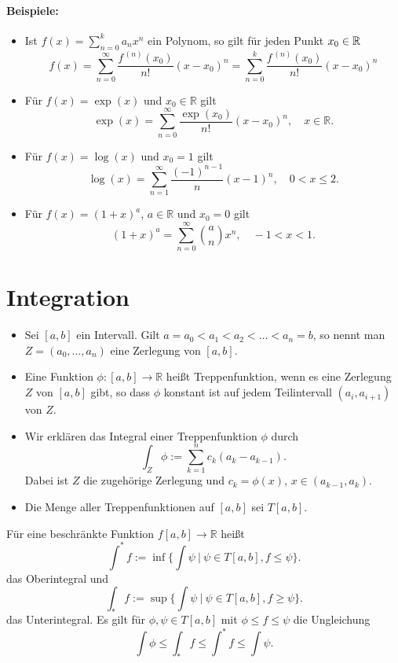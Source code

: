 \documentclass[a4paper,12pt,DIV15]{scrartcl}
\begin{document}
\paragraph{Beispiele:}
\begin{itemize}
\item Ist $f(x) = \sum_{n=0}^k a_n x^n$ ein Polynom, so gilt für jeden Punkt $x_0 \in \mathbb{R}$
\[
 f(x) = \sum_{n=0}^\infty \frac{f^{\,(n)}(x_0)}{n!}(x-x_0)^n 
 = \sum_{n=0}^k  \frac{f^{\,(n)}(x_0)}{n!}(x-x_0)^n
\]
\item Für $f(x)=\exp(x)$ und $x_0 \in \mathbb{R}$ gilt 
\[ \exp(x)= \sum_{n=0}^\infty \frac{\exp(x_0)}{n!} (x-x_0)^n, \quad x
\in \mathbb{R}.\]
\item Für $f(x)=\log(x)$ und $x_0=1$ gilt
\[ \log (x) = \sum_{n=1}^\infty \frac{(-1)^{n-1}}{n}(x-1)^n, \quad 0 <
x \leq 2.\]
\item Für $f(x)= (1+x)^a$, $a\in \mathbb{R}$  und $x_0=0$ gilt
\[ (1+x)^a= \sum_{n =0}^\infty \binom{a}{n}{x^n}, \quad -1 <
x < 1. \]
\end{itemize}

\section{Integration}
\begin{itemize}
\item  Sei $[a,b]$ ein Intervall. Gilt $a=a_0 < a_1 <a_2 < \dots <
                                 a_n=b$, so nennt man $Z=(a_0, \dots
                                 ,a_n)$ eine {\color{red} Zerlegung} von
                                 $[a,b]$.
\item Eine Funktion $\phi:[a,b] \rightarrow \mathbb{R}$ heißt {\color{red}
                                 Treppenfunktion}, wenn es eine
                                 Zerlegung $Z$ von $[a,b]$ gibt, so dass
                                 $\phi$ konstant ist auf jedem
                                 Teilintervall $(a_i,a_{i+1})$ von $Z$.
\item Wir erklären das Integral einer Treppenfunktion $\phi$ durch
\[\int_Z \phi := \sum_{k=1}^n c_k (a_k -a_{k-1}).\]
Dabei ist $Z$ die zugehörige Zerlegung und $c_k=\phi(x)$, $x\in
(a_{k-1},a_k)$.  
\item Die Menge aller Treppenfunktionen auf $[a,b]$ sei $T[a,b]$.
\end{itemize}


\begin{defn}
Für eine beschränkte Funktion $f[a,b]\rightarrow \mathbb{R}$
heißt
\[ \int^*f:= \inf  \{ \int \psi \ | \ \psi \in T[a,b], f \leq \psi \}. \]
das {\color{red} Oberintegral} und 
\[ \int_*f:= \sup  \{ \int \psi \ | \ \psi \in T[a,b], f \geq \psi \}.\]
das {\color{red} Unterintegral}. Es gilt für $\phi, \psi \in T[a,b]$ mit
$\phi \leq f \leq \psi$ die Ungleichung
\[ \int \phi \leq \int_* f \leq \int^* f \leq \int \psi.\]
\end{defn}
\end{document}

